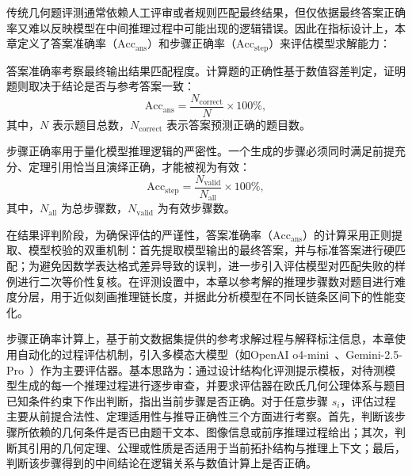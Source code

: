


传统几何题评测通常依赖人工评审或者规则匹配最终结果，但仅依据最终答案正确率又难以反映模型在中间推理过程中可能出现的逻辑错误。因此在指标设计上，本章定义了答案准确率（$\mathrm{Acc}_{\text{ans}}$）和步骤正确率（$\mathrm{Acc}_{\text{step}}$）来评估模型求解能力：

答案准确率考察最终输出结果匹配程度。计算题的正确性基于数值容差判定，证明题则取决于结论是否与参考答案一致：
\begin{equation}
  \mathrm{Acc}_{\text{ans}}=\frac{N_{\text{correct}}}{N}\times 100\%
  \label{eq:ans_acc},
\end{equation}
其中，$N$ 表示题目总数，$N_{\text{correct}}$ 表示答案预测正确的题目数。

步骤正确率用于量化模型推理逻辑的严密性。一个生成的步骤必须同时满足前提充分、定理引用恰当且演绎正确，才能被视为有效：
\begin{equation}
  \mathrm{Acc}_{\text{step}}=\frac{N_{\text{valid}}}{N_{\text{all}}}\times 100\%,
  \label{eq:step_acc}
\end{equation}
其中，$N_{\text{all}}$ 为总步骤数，$N_{\text{valid}}$ 为有效步骤数。


在结果评判阶段，为确保评估的严谨性，答案准确率（$\mathrm{Acc}_{\text{ans}}$）的计算采用正则提取、模型校验的双重机制：首先提取模型输出的最终答案，并与标准答案进行硬匹配；为避免因数学表达格式差异导致的误判，进一步引入评估模型对匹配失败的样例进行二次等价性复核。在评测设置中，本章以参考解的推理步骤数对题目进行难度分层，用于近似刻画推理链长度，并据此分析模型在不同长链条区间下的性能变化。

步骤正确率计算上，基于前文数据集提供的参考求解过程与解释标注信息，本章使用自动化的过程评估机制，引入多模态大模型（如OpenAI o4-mini~\cite{openai2025o3o4mini}、Gemini-2.5-Pro~\cite{comanici2025gemini25}）作为主要评估器。基本思路为：通过设计结构化评测提示模板，对待测模型生成的每一个推理过程进行逐步审查，并要求评估器在欧氏几何公理体系与题目已知条件约束下作出判断，指出当前步骤是否正确。对于任意步骤 $s_i$，评估过程主要从前提合法性、定理适用性与推导正确性三个方面进行考察。首先，判断该步骤所依赖的几何条件是否已由题干文本、图像信息或前序推理过程给出；其次，判断其引用的几何定理、公理或性质是否适用于当前拓扑结构与推理上下文；最后，判断该步骤得到的中间结论在逻辑关系与数值计算上是否正确。

